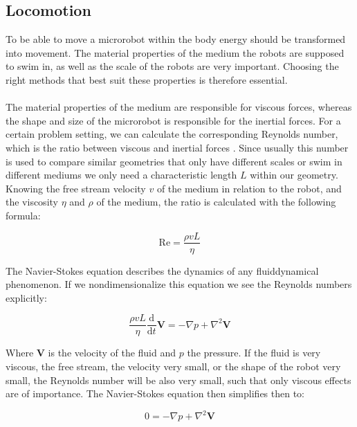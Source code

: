 \subsection{Locomotion}
To be able to move a microrobot within the body energy should be transformed into movement. The material properties of the medium the robots are supposed to swim in, as well as the scale of the robots are very important. Choosing the right methods that best suit these properties is therefore essential. \\\\
The material properties of the medium are responsible for viscous forces, whereas the shape and size of the microrobot is responsible for the inertial forces. For a certain problem setting, we can calculate the corresponding Reynolds number, which is the ratio between viscous and inertial forces \cite{Purcell1977}. Since usually this number is used to compare similar geometries that only have different scales or swim in different mediums we only need a characteristic length $L$ within our geometry. Knowing the free stream velocity $v$ of the medium in relation to the robot, and the viscosity $\eta$ and $\rho$ of the medium, the ratio is calculated with the following formula:

\begin{equation}
\mathrm{Re} = \frac{\rho v L}{\eta}
\end{equation}

The Navier-Stokes equation describes the dynamics of any fluiddynamical phenomenon. If we nondimensionalize this equation we see the Reynolds numbers explicitly:

\begin{equation}
\frac{\rho v L}{\eta} \frac{\mathrm{d}}{\mathrm{d}t}\textbf{V} = - \nabla p + \nabla^2\textbf{V}
\end{equation}

Where $\textbf{V}$ is the velocity of the fluid and $p$ the pressure. If the fluid is very viscous, the free stream, the velocity very small, or the shape of the robot very small, the Reynolds number will be also very small, such that only viscous effects are of importance. The Navier-Stokes equation then simplifies then to: 

\begin{equation}
0 = - \nabla p + \nabla^2\textbf{V}
\end{equation}

